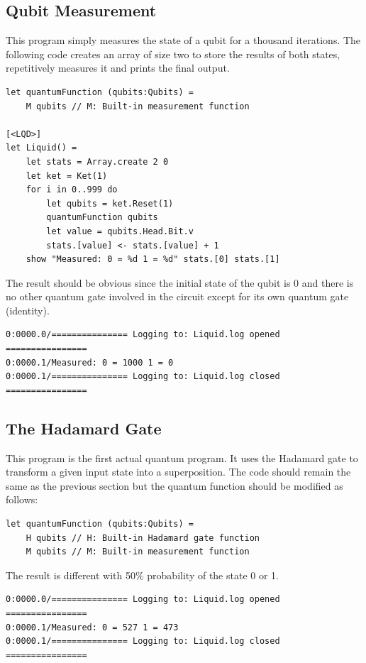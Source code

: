 \documentclass[12pt]{third-rep}
\begin{document}
\subsection{Qubit Measurement}
This program simply measures the state of a qubit for a thousand iterations. The following code creates an array of size two to store the results of both states, repetitively measures it and prints the final output.
\begin{verbatim}
let quantumFunction (qubits:Qubits) =
    M qubits // M: Built-in measurement function

[<LQD>]
let Liquid() =
    let stats = Array.create 2 0
    let ket = Ket(1)
    for i in 0..999 do
        let qubits = ket.Reset(1) 
        quantumFunction qubits
        let value = qubits.Head.Bit.v
        stats.[value] <- stats.[value] + 1
    show "Measured: 0 = %d 1 = %d" stats.[0] stats.[1]
\end{verbatim}
The result should be obvious since the initial state of the qubit is 0 and there is no other quantum gate involved in the circuit except for its own quantum gate (identity).
\begin{verbatim}
0:0000.0/=============== Logging to: Liquid.log opened ================
0:0000.1/Measured: 0 = 1000 1 = 0
0:0000.1/=============== Logging to: Liquid.log closed ================
\end{verbatim}

\subsection{The Hadamard Gate}
This program is the first actual quantum program. It uses the Hadamard gate to transform a given input state into a superposition. The code should remain the same as the previous section but the quantum function should be modified as follows:
\begin{verbatim}
let quantumFunction (qubits:Qubits) =
    H qubits // H: Built-in Hadamard gate function
    M qubits // M: Built-in measurement function
\end{verbatim}
The result is different with 50\% probability of the state 0 or 1.
\begin{verbatim}
0:0000.0/=============== Logging to: Liquid.log opened ================
0:0000.1/Measured: 0 = 527 1 = 473
0:0000.1/=============== Logging to: Liquid.log closed ================
\end{verbatim}
\end{document}
